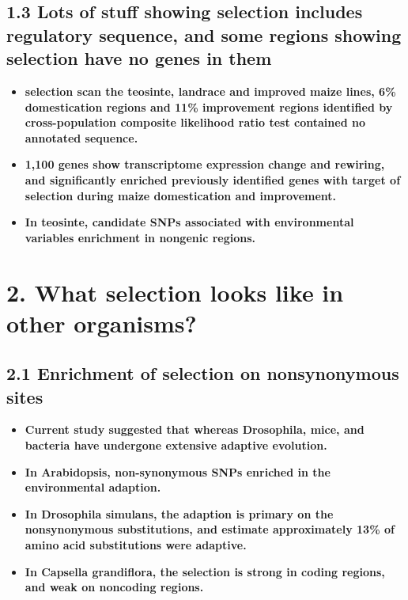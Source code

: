 \documentclass[12pt]{article}
\begin{document}
\subsection*{1.3 Lots of stuff showing selection includes regulatory sequence, and some regions showing selection have no genes in them}
\begin{itemize}
\item \textbf{selection scan the teosinte, landrace and improved maize lines, 6\% domestication regions and 11\% improvement regions identified by cross-population composite likelihood ratio test contained no annotated sequence.}

\item \textbf{1,100 genes show transcriptome expression change and rewiring, and significantly enriched previously identified genes with target of selection during maize domestication and improvement.}

\item \textbf{In teosinte, candidate SNPs associated with environmental variables enrichment in nongenic regions.}
\end{itemize}

\section*{2. What selection looks like in other organisms?}
\subsection*{2.1 Enrichment of selection on nonsynonymous sites}
\begin{itemize}
\item \textbf{Current study suggested that whereas Drosophila, mice, and bacteria have undergone extensive adaptive evolution.}

\item \textbf{In Arabidopsis, non-synonymous SNPs enriched in the environmental adaption.}

\item \textbf{In Drosophila simulans, the adaption is primary on the nonsynonymous substitutions, and estimate approximately 13\% of amino acid substitutions were adaptive.}

\item \textbf{In Capsella grandiflora, the selection is strong in coding regions, and weak on noncoding regions.}
\end{itemize}
\end{document}
